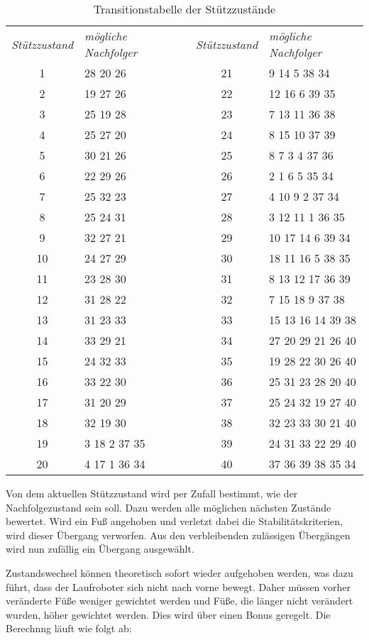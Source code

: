 \begin{table}[ht!]
\begin{tabular}{|c|l|c|c|l|} 
\cline{1-2}\cline{4-5}
\emph{Stützzustand} & \emph{mögliche Nachfolger} & &\emph{Stützzustand} & \emph{mögliche Nachfolger} \\
\cline{1-2}\cline{4-5}
1 & 28 20 26  & & 21&9 14 5 38 34 \\
2 & 19 27 26  & & 22&12 16 6 39 35 \\
3 & 25 19 28  & & 23&7 13 11 36 38 \\
4 & 25 27 20  & & 24&8 15 10 37 39 \\
5 & 30 21 26  & & 25&8 7 3 4 37 36 \\
6 & 22 29 26  & & 26&2 1 6 5 35 34 \\
7 & 25 32 23  & & 27&4 10 9 2 37 34 \\
8 & 25 24 31  & & 28&3 12 11 1 36 35 \\
9 & 32 27 21  & & 29&10 17 14 6 39 34 \\
10 & 24 27 29  & & 30&18 11 16 5 38 35 \\
11 & 23 28 30  & & 31&8 13 12 17 36 39 \\
12 & 31 28 22  & & 32&7 15 18 9 37 38 \\
13 & 31 23 33  & & 33&15 13 16 14 39 38 \\
14 & 33 29 21  & & 34&27 20 29 21 26 40 \\
15 & 24 32 33  & & 35&19 28 22 30 26 40 \\
16 & 33 22 30  & & 36&25 31 23 28 20 40 \\
17 & 31 20 29  & & 37&25 24 32 19 27 40 \\
18 & 32 19 30  & & 38&32 23 33 30 21 40 \\
19 & 3 18 2 37 35  & & 39&24 31 33 22 29 40 \\
20 & 4 17 1 36 34  & & 40&37 36 39 38 35 34 \\
\cline{1-2}\cline{4-5}
\end{tabular}
\caption{\label{trans_support} Transitionstabelle der Stützzustände \autocite{herms2004}}
\end{table}

Von dem aktuellen Stützzustand wird per Zufall bestimmt, wie der Nachfolgezustand sein soll. Dazu werden alle möglichen nächsten Zustände bewertet. Wird ein Fuß angehoben und verletzt dabei die Stabilitätskriterien, wird dieser Übergang verworfen. Aus den verbleibenden zulässigen Übergängen wird nun zufällig ein Übergang ausgewählt.

Zustandswechsel können theoretisch sofort wieder aufgehoben werden, was dazu führt, dass der Laufroboter sich nicht nach vorne bewegt. Daher müssen vorher veränderte Füße weniger gewichtet werden und Füße, die länger nicht verändert wurden, höher gewichtet werden. Dies wird über einen Bonus geregelt. Die Berechnng läuft wie folgt ab:

